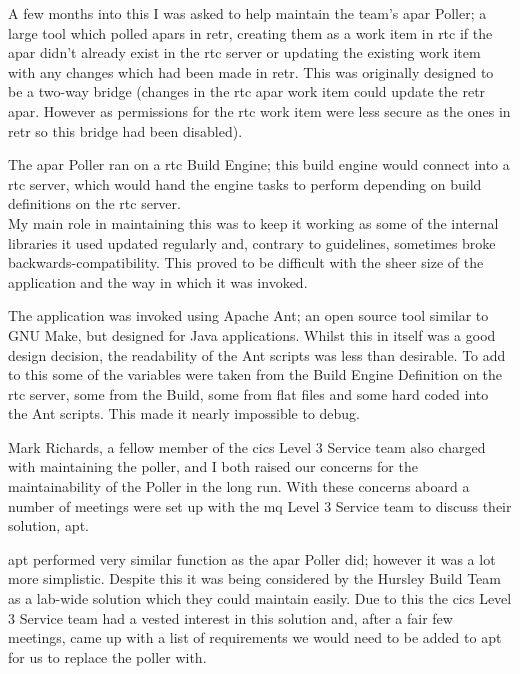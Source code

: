 \documentclass[a4paper,11pt]{report}
\begin{document}
A few months into this I was asked to help maintain the team's \gls{apar} Poller; a large tool 
which polled \gls{apar}s in \gls{retr}, creating them as a work item in \gls{rtc} if the \gls{apar}
didn't already exist in the \gls{rtc} server or updating the existing work item with any changes
which had been made in \gls{retr}. This was originally designed to be a two-way bridge (changes in
the \gls{rtc} \gls{apar} work item could update the \gls{retr} \gls{apar}. However as permissions
for the \gls{rtc} work item were less secure as the ones in \gls{retr} so this bridge had been 
disabled).

The \gls{apar} Poller ran on a \gls{rtc} Build Engine; this build engine would connect into a 
\gls{rtc} server, which would hand the engine tasks to perform depending on build definitions on
the \gls{rtc} server. \\



My main role in maintaining this was to keep it working as some of the internal libraries it used
updated regularly and, contrary to guidelines, sometimes broke backwards-compatibility. This 
proved to be difficult with the sheer size of the application and the way in which it was invoked.

The application was invoked using Apache Ant; an open source tool similar to GNU Make, but designed
for Java applications. Whilst this in itself was a good design decision, the readability of the 
Ant scripts was less than desirable. To add to this some of the variables were taken from the 
Build Engine Definition on the \gls{rtc} server, some from the Build, some from flat files and some
hard coded into the Ant scripts. This made it nearly impossible to debug.

Mark Richards, a fellow member of the \gls{cics} Level 3 Service team also charged with maintaining
the poller, and I both raised our concerns for the maintainability of the Poller in the long run.
With these concerns aboard a number of meetings were set up with the \gls{mq} Level 3 Service team
to discuss their solution, \gls{apt}.

\gls{apt} performed very similar function as the \gls{apar} Poller did; however it was a lot more
simplistic. Despite this it was being considered by the Hursley Build Team as a lab-wide solution
which they could maintain easily. Due to this the \gls{cics} Level 3 Service team had a vested
interest in this solution and, after a fair few meetings, came up with a list of requirements we
would need to be added to \gls{apt} for us to replace the poller with. \\
\end{document}
